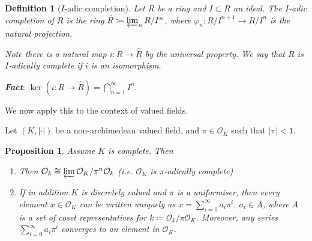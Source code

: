 \documentclass[]{article}
\theoremstyle{custhm}
\theoremstyle{cusdef}
\newtheorem{defin}[theorem]{Definition}
\theoremstyle{custhm}
\theoremstyle{custhm}
\theoremstyle{custhm}
\newtheorem{prop}[theorem]{Proposition}
\theoremstyle{custhm}
\theoremstyle{cusdef}
\theoremstyle{remark}
\newcommand{\ra}{\rightarrow}
\newcommand{\undf}[1]{\textit{\textbf{#1}}}
\renewcommand{\it}[1]{\textit{#1}}
\renewcommand{\phi}{\varphi}
\newcommand{\valk}{(K,|\cdot|)}
\renewcommand{\O}{\mathcal{O}}
\begin{document}
\begin{defin}[$I$-adic completion]
Let $R$ be a ring and $I\subset R$ an ideal. The $I$-adic completion of $R$ is the ring $\hat{R}\coloneqq \varprojlim_n R/I^n$, where $\phi_n:R/I^{n+1}\ra R/I^n$ is the natural projection.

Note there is a natural map $i:R\ra\hat{R}$ by the universal property. We say that $R$ is $I$-adically complete if $i$ is an isomorphism. 
\end{defin}
\undf{Fact}: $\ker (i:R\ra\hat{R}) = \bigcap_{n=1}^{\infty}I^n$.

We now apply this to the context of valued fields.

Let $\valk$ be a non-archimedean valued field, and $\pi \in \O_K$ such that $|\pi| < 1$.

\begin{prop}
Assume $K$ is complete. Then
\begin{enumerate}[label = (\roman*)]
	\item Then $\O_k \cong \varprojlim \O_K / \pi^n\O_k$ (\it{i.e.} $\O_K$ is $\pi$-adically complete)
	\item If in addition $K$ is discretely valued and $\pi$ is a uniformiser, then every element $x\in \O_K$ can be written uniquely as $x = \sum_{i=0}^{\infty}a_i\pi^i,\ a_i\in A$, where $A$ is a set of coset representatives for $k\coloneqq \O_k/\pi\O_K$.
	Moreover, any series $\sum_{i=0}^{\infty}a_i\pi^i$ converges to an element in $\O_K$.
\end{enumerate}
\end{prop}
\end{document}
